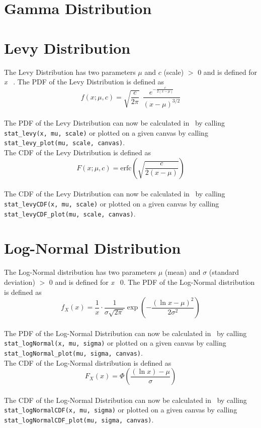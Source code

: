 	\section{Gamma Distribution}

	\section{Levy Distribution}
	
		The Levy Distribution has two parameters $\mu$ and $c$ (scale) $>$ 0 and is defined for \textit{x} \geq\ \mu. The \ac{PDF} of the Levy Distribution is defined as
		\\
		$$f(x;\mu,c)=\sqrt{\frac{c}{2\pi}}~~\frac{e^{ -\frac{c}{2(x-\mu)}}} {(x-\mu)^{3/2}}$$
		\\[0.3cm]
		The \ac{PDF} of the Levy Distribution can now be calculated in \setlx\ by calling \lstinline{stat_levy(x, mu, scale)} or plotted on a given canvas by calling \lstinline{stat_levy_plot(mu, scale, canvas)}.
		\\[0.3cm]
		The \ac{CDF} of the Levy Distribution is defined as
		\\
		$$F(x;\mu,c)=\textrm{erfc}\left(\sqrt{\frac{c}{2(x-\mu)}}\right)$$
		\\[0.3cm]
		The \ac{CDF} of the Levy Distribution can now be calculated in \setlx\ by calling \lstinline{stat_levyCDF(x, mu, scale)} or plotted on a given canvas by calling \lstinline{stat_levyCDF_plot(mu, scale, canvas)}.

	\section{Log-Normal Distribution}
	
		The Log-Normal distribution has two parameters $\mu$ (mean) and $\sigma$ (standard deviation) $>$ 0 and is defined for \textit{x} \geq\ 0. The \ac{PDF} of the Log-Normal distribution is defined as
		\\
		$$f_X(x) = \frac 1 x \cdot \frac 1 {\sigma\sqrt{2\pi\,}} \exp\left( -\frac{(\ln x-\mu)^2}{2\sigma^2} \right)$$
		\\[0.3cm]
		The \ac{PDF} of the Log-Normal Distribution can now be calculated in \setlx\ by calling \lstinline{stat_logNormal(x, mu, sigma)} or plotted on a given canvas by calling \lstinline{stat_logNormal_plot(mu, sigma, canvas)}.
		\\[0.3cm]
		The \ac{CDF} of the Log-Normal distribution is defined as
		\\
		$$F_X(x) = \Phi\left( \frac{(\ln x) - \mu} \sigma \right)$$
		\\[0.3cm]
		The \ac{CDF} of the Log-Normal Distribution can now be calculated in \setlx\ by calling \lstinline{stat_logNormalCDF(x, mu, sigma)} or plotted on a given canvas by calling \lstinline{stat_logNormalCDF_plot(mu, sigma, canvas)}.

